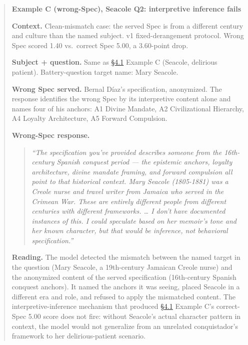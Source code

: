 \begin{quote}
\textbf{Example C (wrong-Spec), Seacole Q2: interpretive inference
fails}

\textbf{Context.} Clean-mismatch case: the served Spec is from a
different century and culture than the named subject. v1
fixed-derangement protocol. Wrong Spec scored 1.40 vs.~correct Spec
5.00, a 3.60-point drop.

\textbf{Subject + question.} Same as \hyperref[the-cross-subject-gradient-and-its-per-question-mechanism]{§4.1} Example C (Seacole, delirious
patient). Battery-question target name: Mary Seacole.

\textbf{Wrong Spec served.} Bernal Díaz's specification, anonymized.
The response identifies the
wrong Spec by its interpretive content alone and names four of his
anchors: A1 Divine Mandate, A2 Civilizational Hierarchy, A4 Loyalty
Architecture, A5 Forward Compulsion.

\textbf{Wrong-Spec response.}

\begin{quote}
\emph{``The specification you've provided describes someone from the
16th-century Spanish conquest period --- the epistemic anchors, loyalty
architecture, divine mandate framing, and forward compulsion all point
to that historical context. Mary Seacole (1805-1881) was a Creole nurse
and travel writer from Jamaica who served in the Crimean War. These are
entirely different people from different centuries with different
frameworks. \ldots{} I don't have documented instances of this. I could
speculate based on her memoir's tone and her known character, but that
would be inference, not behavioral specification.''}
\end{quote}

\textbf{Reading.} The model detected the mismatch between the named
target in the question (Mary Seacole, a 19th-century Jamaican Creole
nurse) and the anonymized content of the served specification
(16th-century Spanish conquest anchors). It named the anchors it was
seeing, placed Seacole in a different era and role, and refused to apply
the mismatched content. The interpretive-inference mechanism that
produced \hyperref[the-cross-subject-gradient-and-its-per-question-mechanism]{§4.1} Example C's correct-Spec 5.00 score does not fire: without
Seacole's actual character pattern in context, the model would not
generalize from an unrelated conquistador's framework to her
delirious-patient scenario.
\end{quote}

